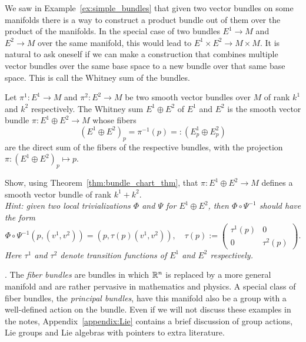 We saw in Example~\ref{ex:simple_bundles} that given two vector bundles on some manifolds there is a way to construct a product bundle out of them over the product of the manifolds.
In the special case of two bundles $E^1 \to M$ and $E^2 \to M$ over the same manifold, this would lead to $E^1 \times E^2 \to M \times M$.
It is natural to ask oneself if we can make a construction that combines multiple vector bundles over the same base space to a new bundle over that same base space.
This is call the Whitney sum of the bundles.
\begin{exercise}\label{ex:whitney}
  Let $\pi^1 : E^1 \to M$ and $\pi^2 : E^2 \to M$ be two smooth vector bundles over $M$ of rank $k^1$ and $k^2$ respectively.
  The Whitney sum $E^1 \oplus E^2$ of $E^1$ and $E^2$ is the smooth vector bundle $\pi: E^1 \oplus E^2 \to M$ whose fibers
  \begin{equation}
    (E^1 \oplus E^2)_p = \pi^{-1}(p) =: (E^1_p \oplus E^2_p)
  \end{equation}
  are the direct sum of the fibers of the respective bundles, with the projection $\pi: (E^1\oplus E^2)_p \mapsto p$.

  Show, using Theorem~\ref{thm:bundle_chart_thm}, that $\pi: E^1 \oplus E^2 \to M$ defines a smooth vector bundle of rank $k^1 + k^2$.\\
  \textit{\small
    Hint: given two local trivializations $\varPhi$ and $\varPsi$ for $E^1\oplus E^2$, then $\varPhi\circ\varPsi^{-1}$ should have the form
    \begin{equation}
      \varPhi\circ\varPsi^{-1}(p, (v^1, v^2)) = (p, \tau(p)(v^1, v^2)), \quad
      \tau(p) :=
      \begin{pmatrix}
        \tau^1(p) & 0         \\
        0         & \tau^2(p)
      \end{pmatrix}.
    \end{equation}
    Here $\tau^1$ and $\tau^2$ denote transition functions of $E^1$ and $E^2$ respectively.
  }
\end{exercise}

.
The \emph{fiber bundles} are bundles in which $\mathbb{R}^n$ is replaced by a more general manifold and are rather pervasive in mathematics and physics.
A special class of fiber bundles, the \emph{principal bundles}, have this manifold also be a group with a well-defined action on the bundle.
Even if we will not discuss these examples in the notes, Appendix~\ref{appendix:Lie} contains a brief discussion of group actions, Lie groups and Lie algebras with pointers to extra literature.

